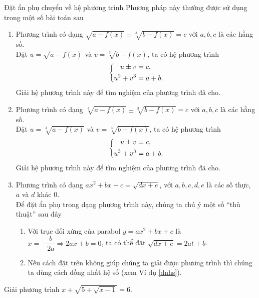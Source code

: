 \begin{dang}{Đặt ẩn phụ chuyển về hệ phương trình}
	Phương pháp này thường được sử dụng trong một số bài toán sau
	\begin{enumerate}
		\item Phương trình có dạng $\sqrt{a-f(x)}\pm \sqrt[3]{b-f(x)}=c$ với $a, b,c$ là các hằng số.\\
		Đặt $u=\sqrt{a-f(x)}$ và $v=\sqrt[3]{b-f(x)}$, ta có hệ phương trình $$\left\{\begin{aligned}u\pm v&=c, \\ u^2+v^3&=a+b.\end{aligned}\right.$$
		Giải hệ phương trình này để tìm nghiệm của phương trình đã cho.
		\item Phương trình có dạng $\sqrt[3]{a-f(x)}\pm \sqrt[3]{b-f(x)}=c$ với $a, b,c$ là các hằng số.\\
		Đặt $u=\sqrt[3]{a-f(x)}$ và $v=\sqrt[3]{b-f(x)}$, ta có hệ phương trình $$\left\{\begin{aligned}u\pm v&=c, \\ u^3+v^3&=a+b.\end{aligned}\right.$$
		Giải hệ phương trình này để tìm nghiệm của phương trình đã cho.
		\item Phương trình có dạng $ax^2+bx+c=\sqrt{dx+e}$, với $a, b, c, d, e$ là các số thực, $a$ và $d$ khác $0$.\\
		Để đặt ẩn phụ trong dạng phương trình này, chúng ta chú ý một số ``thủ thuật'' sau đây
		\begin{enumerate}
			\item Với trục đối xứng của parabol $y=ax^2+bx+c$ là $x=-\dfrac{b}{2a} \Rightarrow 2ax+b=0$, ta có thể đặt $\sqrt{dx+e}=2at+b$.
			\item Nếu cách đặt trên không giúp chúng ta giải được phương trình thì chúng ta dùng cách đồng nhất hệ số (xem Ví dụ \ref{dnhs}).
		\end{enumerate}
	\end{enumerate}
\end{dang}

\begin{vd}%
	Giải phương trình $x+\sqrt{5+\sqrt{x-1}}=6$.
\end{vd}

